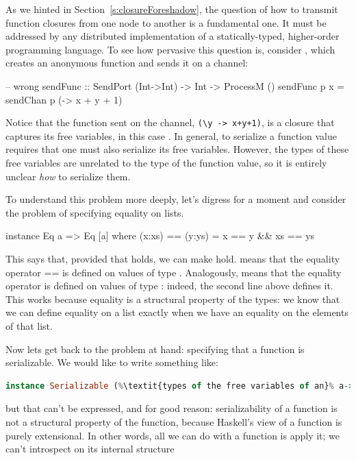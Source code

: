 \documentclass{sigplanconf}
\begin{document}
As we hinted in Section~\ref{s:closureForeshadow}, 
the question of how to transmit function closures from one node to another is a fundamental one.  
It must be addressed by any distributed implementation of a statically-typed, 
higher-order programming language.  
To see how pervasive this question is, consider , which creates an anonymous function and sends it on a channel: \label{p_sendfunc}
\begin{code}
-- wrong
sendFunc :: SendPort (Int->Int) -> Int -> ProcessM ()
sendFunc p x = sendChan p (\y -> x + y + 1)
\end{code}
Notice that the function sent on the channel, \lstinline!(\y -> x+y+1)!,
is a closure that captures its free variables,
in this case . 
In general, to serialize a function value requires that one must also serialize its free variables.
However, the types of
these free variables are unrelated to the type of the function
value, so it is entirely unclear \emph{how} to serialize them.

To understand this problem more deeply, let's digress for a moment and consider the problem of specifying equality on lists.
\begin{code}
  instance Eq a => Eq [a] where
  	(x:xs) == (y:ys) = x == y && xs == ys
\end{code}
This says that, provided that  holds, we can make  hold.
 means that the equality operator \textsf{=\!=} is defined on values of type .  Analogously,  means that the equality operator is defined on values of type \textt{[a]}: indeed, the second line above defines it.
This works because equality is a structural property of the types: we know that we can define equality on a list exactly when we have an equality on the elements of that list.

Now lets get back to the problem at hand: specifying that a function is serializable.
We would like to write something like:
\begin{lstlisting}[language=Haskell,
			escapechar={\%},
			stringstyle=\ttfamily,keywords={let,case,of,do,where,module,in,if,then,else,data,deriving,default,class,instance,import,hiding,forall,qualified,newtype,type,as}]
  instance Serializable (%\textit{types of the free variables of an}% a->b) => Serializable (a->b) where ...
\end{lstlisting}
but that can't be expressed, and for good reason:  serializability of a function is not a structural property of the function, because Haskell's view of a function is purely extensional.  
In other words, all we can do with a function is apply it; we can't introspect on its internal structure
\end{document}
